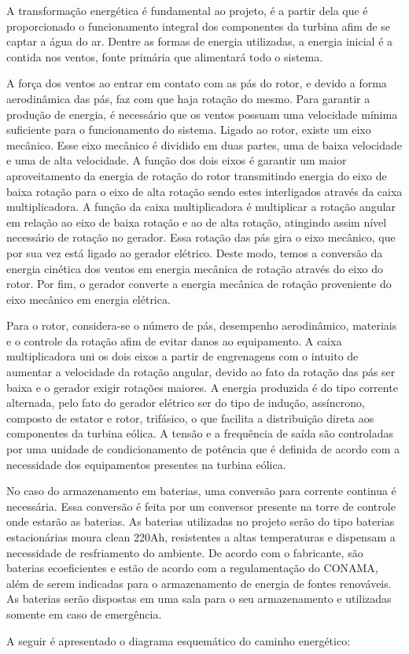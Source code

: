 A transformação energética é fundamental ao projeto, é a partir dela que é proporcionado o funcionamento integral dos componentes da turbina afim de se captar a água do ar. Dentre as formas de energia utilizadas, a energia inicial é a contida nos ventos, fonte primária que alimentará todo o sistema. 

A força dos ventos ao entrar em contato com as pás do rotor, e devido a forma aerodinâmica das pás, faz com que haja rotação do mesmo. Para garantir a produção de energia, é necessário que os ventos possuam uma velocidade mínima suficiente para o funcionamento do sistema.  Ligado ao rotor, existe um eixo mecânico. Esse eixo mecânico é dividido em duas partes, uma de baixa velocidade e uma de alta velocidade. A função dos dois eixos é garantir um maior aproveitamento da energia de rotação do rotor transmitindo energia do eixo de baixa rotação para o eixo de alta rotação sendo estes interligados através da caixa multiplicadora. A função da caixa multiplicadora é multiplicar a rotação angular em relação ao eixo de baixa rotação e ao de alta rotação, atingindo assim nível necessário de rotação no gerador. Essa rotação das pás gira o eixo mecânico, que por sua vez está ligado ao gerador elétrico. Deste modo, temos a conversão da energia cinética dos ventos em energia mecânica de rotação através do eixo do rotor. Por fim, o gerador  converte a energia mecânica de rotação proveniente do eixo mecânico em energia elétrica. 

Para o rotor, considera-se o número de pás, desempenho aerodinâmico, materiais e o controle da rotação afim de evitar danos ao equipamento. A caixa multiplicadora uni os dois eixos a partir de engrenagens com o intuito de aumentar a velocidade da rotação angular, devido ao fato da rotação das pás ser baixa e o gerador exigir rotações maiores. A energia produzida é do tipo corrente alternada, pelo fato do gerador elétrico ser do tipo de indução, assíncrono, composto de estator e rotor, trifásico, o que facilita a distribuição direta aos componentes da turbina eólica. A tensão e a frequência de saída são controladas por uma unidade de condicionamento de potência que é definida de acordo com a necessidade dos equipamentos presentes na turbina eólica.

No caso do armazenamento em baterias, uma conversão para corrente continua é necessária. Essa conversão é feita por um conversor presente na torre de controle onde estarão as baterias.  As baterias utilizadas no projeto serão do tipo baterias estacionárias moura clean 220Ah, resistentes a altas temperaturas e dispensam a necessidade de resfriamento do ambiente. De acordo com o fabricante, são baterias ecoeficientes e estão de acordo com a regulamentação do CONAMA, além de serem indicadas para o armazenamento de energia de fontes renováveis. As baterias serão dispostas em uma sala para o seu armazenamento e utilizadas somente em caso de emergência. 

A seguir é apresentado o diagrama esquemático do caminho energético: